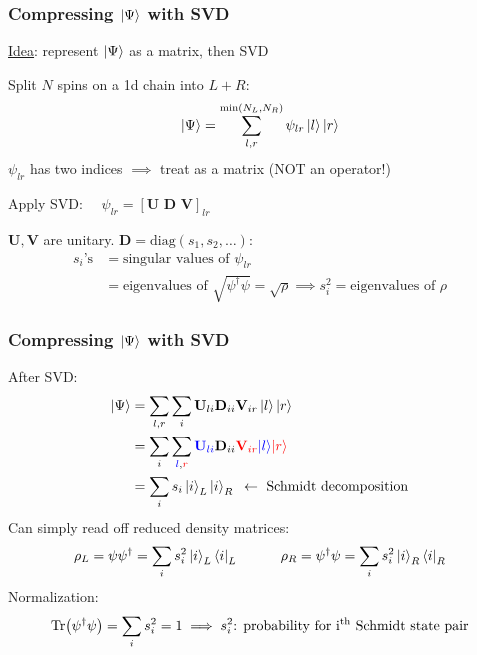\documentclass{beamer}
\theoremstyle{definition}
\begin{document}
\begin{frame}
	\frametitle{Compressing $\ket{\Psi}$ with SVD}
	\underline{Idea}: represent $\ket{\Psi}$ as a matrix, then SVD\\
	
	\vspace{8pt}
	
	Split $N$ spins on a 1d chain into $L+R$: 
	\begin{align*}
		\ket{\Psi} = \sum_{l,r}^{\min(N_L,N_R)} \psi_{lr} \ket{l}\ket{r}
	\end{align*}
	$\psi_{lr}$ has two indices $\implies$ treat as a matrix (NOT an operator!) \\ 
	
	\vspace{8pt} 
	
	Apply SVD: $\quad\psi_{lr} = [\mathbf{U}\,\,\mathbf{D}\,\,\mathbf{V}]_{lr}$\\
	
	\vspace{8pt}
	
	$\mathbf{U}, \mathbf{V}$ are unitary. $\mathbf{D} = \text{diag}(s_1,s_2,\dots)$:
	\begin{align*}
		s_i\text{'s} 
		&= \text{singular values of } \psi_{lr} \\
		&= \text{eigenvalues of } \sqrt{\psi^\dagger\psi} = \sqrt{\rho} \implies s_i^2 = \text{eigenvalues of } \rho
	\end{align*}
	
\end{frame}


\begin{frame}
	\frametitle{Compressing $\ket{\Psi}$ with SVD}
	
	After SVD:
	\begin{align*}
		\ket{\Psi} &= \sum_{l,r} \sum_{i} \mathbf{U}_{li}\mathbf{D}_{ii} \mathbf{V}_{ir} \ket{l}\ket{r}\\
		&= \sum_{i} \sum_{\textcolor{blue}{l},\textcolor{red}{r}}  \textcolor{blue}{\mathbf{U}_{li}}\mathbf{D}_{ii} \textcolor{red}{\mathbf{V}_{ir} } \textcolor{blue}{\ket{l}}\textcolor{red}{\ket{r}}\\
		&= \sum_i s_i \ket{i}_L \ket{i}_R \,\,\,\leftarrow \text{ Schmidt decomposition}
	\end{align*}
	Can simply read off reduced density matrices:
	\begin{align*}
		\rho_L = \psi\psi^\dagger = \sum_i s_i^2 \ket{i}_L \bra{i}_L \quad\quad\quad \rho_R = \psi^\dagger\psi = \sum_i s_i^2 \ket{i}_R \bra{i}_R
	\end{align*}
	Normalization:
	\begin{align*}
		\Tr(\psi^\dagger\psi) = \sum_i s_i^2 = 1 \implies s_i^2 \text{: probability for i$^\text{th}$ Schmidt state pair}
	\end{align*}
\end{frame}
\end{document}
